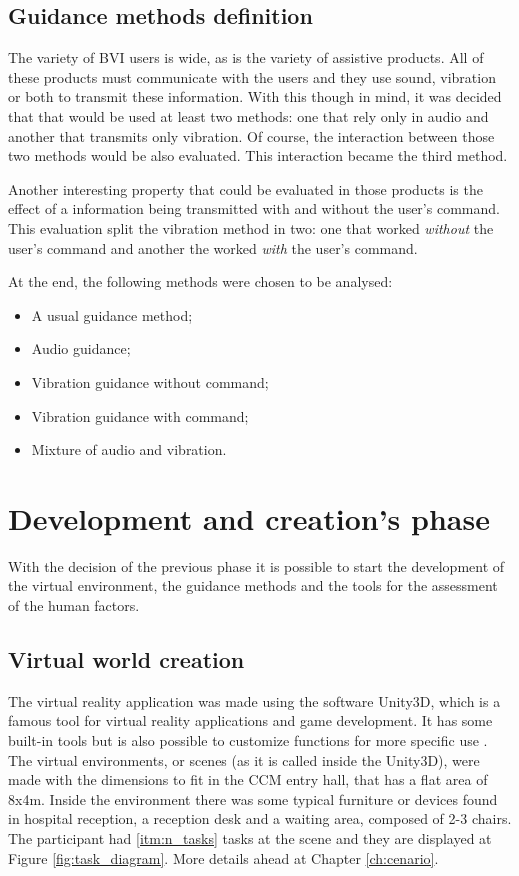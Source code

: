     \subsection{Guidance methods definition}
        The variety of BVI users is wide, as is the variety of assistive products. All of these products must communicate with the users and they use sound, vibration or both to transmit these information. With this though in mind, it was decided that that would be used at least two methods: one that rely only in audio and another that transmits only vibration. Of course, the interaction between those two methods would be also evaluated. This interaction became the third method.
        
        Another interesting property that could be evaluated in those products is the effect of a information being transmitted with and without the user's command. This evaluation split the vibration method in two: one that worked \textit{without} the user's command and another the worked \textit{with} the user's command.
        
        At the end, the following methods were chosen to be analysed:
        
        \begin{itemize}
            \item A usual guidance method;
            \item Audio guidance;
            \item Vibration guidance without command;
            \item Vibration guidance with command;
            \item Mixture of audio and vibration.
        \end{itemize}
    
\section{Development and creation's phase}
\label{sec:creation_phase}
    
    With the decision of the previous phase it is possible to start the development of the virtual environment, the guidance methods and the tools for the assessment of the human factors.

    \subsection{Virtual world creation}
        The virtual reality application was made using the software Unity3D, which is a famous tool for virtual reality applications and game development. It has some built-in tools but is also possible to customize functions for more specific use \cite{wang2010new}. The virtual environments, or scenes (as it is called inside the Unity3D), were made with the dimensions to fit in the CCM entry hall, that has a flat area of 8x4m. Inside the environment there was some typical furniture or devices found in hospital reception, a reception desk and a waiting area, composed of 2-3 chairs. The participant had \ref{itm:n_tasks} tasks at the scene and they are displayed at Figure \ref{fig:task_diagram}. More details ahead at Chapter \ref{ch:cenario}.
        
